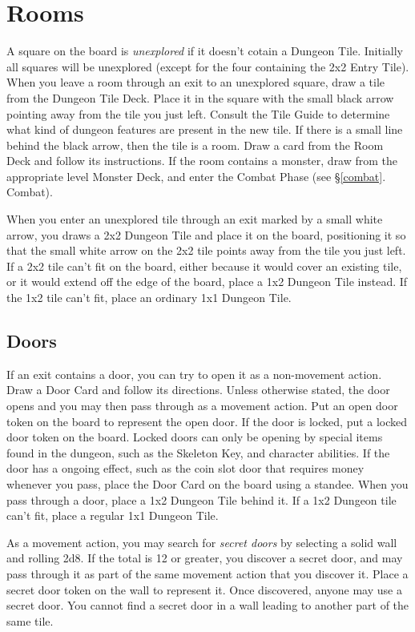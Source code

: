 \documentclass{book}
\begin{document}
\section{Rooms}
A square on the board is \emph{unexplored} if it doesn’t cotain a Dungeon Tile. Initially all squares will be unexplored (except for the four containing the 2x2 Entry Tile). When you leave a room through an exit to an unexplored square, draw a tile from the Dungeon Tile Deck. Place it in the square with the small black arrow pointing away from the tile you just left. Consult the Tile Guide to determine what kind of dungeon features are present in the new tile. If there is a small line behind the black arrow, then the tile is a room. Draw a card from the Room Deck and follow its instructions. If the room contains a monster, draw from the appropriate level Monster Deck, and enter the Combat Phase (see §\ref{combat}. Combat).

When you enter an unexplored tile through an exit marked by a small white arrow, you draws a 2x2 Dungeon Tile and place it on the board, positioning it so that the small white arrow on the 2x2 tile points away from the tile you just left. If a 2x2 tile can’t fit on the board, either because it would cover an existing tile, or it would extend off the edge of the board, place a 1x2 Dungeon Tile instead. If the 1x2 tile can’t fit, place an ordinary 1x1 Dungeon Tile.  

\subsection{Doors}

If an exit contains a door, you can try to open it as a non-movement action. Draw a Door Card and follow its directions. Unless otherwise stated, the door opens and you may then pass through as a movement action. Put an open door token on the board to represent the open door. If the door is locked, put a locked door token on the board. Locked doors can only be opening by special items found in the dungeon, such as the Skeleton Key, and character abilities. If the door has a ongoing effect, such as the coin slot door that requires money whenever you pass, place the Door Card on the board using a standee.
When you pass through a door, place a 1x2 Dungeon Tile behind it. If a 1x2 Dungeon tile can’t fit, place a regular 1x1 Dungeon Tile.

As a movement action, you may search for \emph{secret doors} by selecting a solid wall and rolling 2d8. If the total is 12 or greater, you discover a secret door, and may pass through it as part of the same movement action that you discover it. Place a secret door token on the wall to represent it. Once discovered, anyone may use a secret door.
You cannot find a secret door in a wall leading to another part of the same tile.
\end{document}
